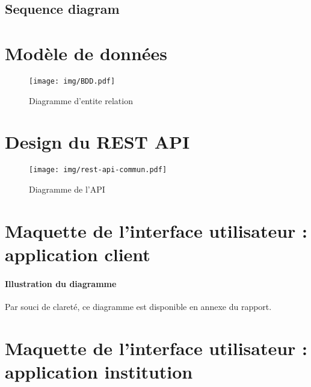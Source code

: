 \documentclass[]{report}
\begin{document}


\newpage

\subsection{Sequence diagram}


\newpage

\section{Modèle de données}

\begin{figure}[h]
	\centering\texttt{[image: img/BDD.pdf]}
	\caption{Diagramme d'entite relation}
\end{figure}


\newpage


\section{Design du REST API}

\begin{figure}[h]
	\centering\texttt{[image: img/rest-api-commun.pdf]}
	\caption{Diagramme de l'API}
\end{figure}




\newpage


\section{Maquette de l'interface utilisateur : application client}



\vspace*{\fill}

\paragraph{Illustration du diagramme} Par souci de clareté, ce diagramme est disponible en annexe du rapport.

\newpage



\section{Maquette de l'interface utilisateur : application institution}
\end{document}
